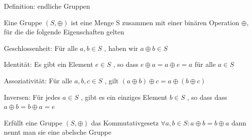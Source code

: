 \documentclass[a4paper]{article}
\begin{document}
\begin{multicols}{3}
\begin{itemize*}
            \item Definition: endliche Gruppen
            \begin{itemize*}
                  \item Eine Gruppe $(S, \oplus)$ ist eine Menge S zusammen mit einer binären Operation $\oplus$, für die die folgende Eigenschaften gelten
                  \item Geschlossenheit: Für alle $a, b \in S$ , haben wir $a \oplus b \in S$
                  \item Identität: Es gibt ein Element $e \in S$ , so dass $e \oplus a = a \oplus e = a$ für alle $a \in S$
                  \item Assoziativität: Für alle $a, b, c \in S$ , gilt $( a \oplus b ) \oplus c = a \oplus ( b \oplus c )$
                  \item Inversen: Für jedes $a \in S$ , gibt es ein einziges Element $b \in S$ , so dass dass $a \oplus b = b \oplus a = e$
                  \item Erfüllt eine Gruppe $( S , \oplus)$ das Kommutativgesetz $\forall a, b \in S : a \oplus b = b \oplus a$ dann nennt man sie eine abelsche Gruppe

\end{itemize*}
\end{itemize*}
\end{multicols}
\end{document}
